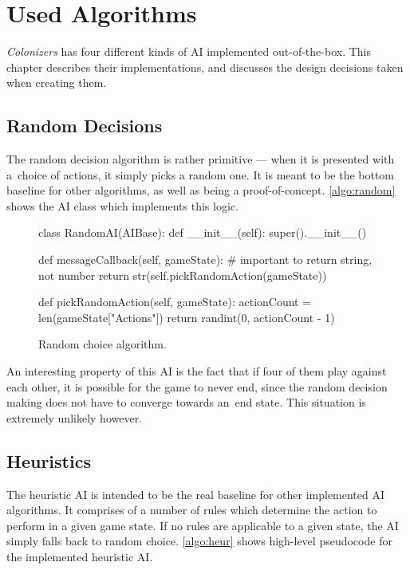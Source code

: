 \chapter{Used Algorithms}

\emph{Colonizers} has four different kinds of AI implemented out-of-the-box.
This chapter describes their implementations, and discusses the design decisions
taken when creating them.

\section{Random Decisions}

The random decision algorithm is rather primitive --- when it is presented with
a~choice of actions, it simply picks a random one. It is meant to be
the bottom baseline for other algorithms,
as well as being a proof-of-concept. \autoref{algo:random} shows the AI class which
implements this logic.

\begin{figure}[h!]
\begin{code}[commandchars=\\\{\},codes={\catcode`\$=3\catcode`\^=7\catcode`\_=8}]
class RandomAI(AIBase):
    def \_\_init\_\_(self):
        super().\_\_init\_\_()

    def messageCallback(self, gameState):
        # important to return string, not number
        return str(self.pickRandomAction(gameState))

    def pickRandomAction(self, gameState):
        actionCount = len(gameState["Actions"])
        return randint(0, actionCount - 1)
\end{code}
\caption{Random choice algorithm.}\label{algo:random}
\end{figure}

An interesting property of this AI is the fact that if four of them play
against each other, it is possible for the game to never end, since
the random decision making does not have to converge towards an~end state.
This situation is extremely unlikely however.

\section{Heuristics}

The heuristic AI is intended to be the real baseline for other implemented AI algorithms.
It comprises of a number of rules which determine the action to perform in a given
game state. If no rules are applicable to a given state, the AI simply
falls back to random choice. \autoref{algo:heur} shows high-level pseudocode for
the implemented heuristic AI.

